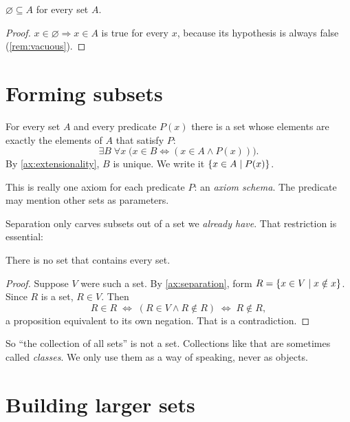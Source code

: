 \begin{corollary}
\label{cor:empty-subset}
$\varnothing \subseteq A$ for every set $A$.
\end{corollary}

\begin{proof}
$x \in \varnothing \Rightarrow x \in A$ is true for every $x$, because its
hypothesis is always false (\cref{rem:vacuous}).
\end{proof}

\section{Forming subsets}

\begin{axiom}[Separation]
\label{ax:separation}
For every set $A$ and every predicate $P(x)$ there is a set whose elements are
exactly the elements of $A$ that satisfy $P$:
\[
  \exists B\; \forall x\; \bigl( x \in B \Leftrightarrow (x \in A \land P(x))
  \bigr).
\]
By \cref{ax:extensionality}, $B$ is unique. We write it $\lbrace x \in A \mid P(x) \rbrace$.
\end{axiom}

This is really one axiom for each predicate $P$: an \emph{axiom schema}. The
predicate may mention other sets as parameters.

Separation only carves subsets out of a set we \emph{already have}. That
restriction is essential:

\begin{theorem}[Russell]
\label{thm:russell}
There is no set that contains every set.
\end{theorem}

\begin{proof}
Suppose $V$ were such a set. By \cref{ax:separation}, form $R = \lbrace x \in
V \mid x \notin x \rbrace$. Since $R$ is a set, $R \in V$. Then
\[
  R \in R \;\Leftrightarrow\; (R \in V \land R \notin R) \;\Leftrightarrow\; R
  \notin R,
\]
a proposition equivalent to its own negation. That is a contradiction.
\end{proof}

So \enquote{the collection of all sets} is not a set. Collections like that are
sometimes called \emph{classes}. We only use them as a way of speaking, never as
objects.

\section{Building larger sets}

